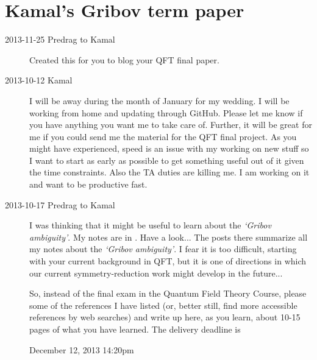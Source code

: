 
\chapter{Kamal's Gribov term paper}
\label{c-dailyBlogKS}

\begin{description}
\item[2013-11-25  Predrag to Kamal] Created this for you to blog
your QFT final paper.

\item[2013-10-12  Kamal] I will be away during the month of January for my wedding.
I will be working from home and updating through GitHub.
Please let me know if you have anything you want me to take care of.
Further, it will be great for me if you could send me the material
for the QFT final project. As you might have experienced, speed is
an issue with my working on new stuff so I want to start as early
as possible to get something useful out of it given the time constraints.
Also the TA duties are killing me. I am working on it and want to be productive fast.

\item[2013-10-17 Predrag to Kamal] I was thinking that it might be useful
to learn about the \emph{`Gribov ambiguity'}. My notes are in
. Have a look... The posts there summarize all my notes
about the \emph{`Gribov ambiguity'}. I fear it is too difficult, starting
with your current background in QFT, but it is one of directions in which
our current symmetry-reduction work might develop in the future...

So, instead of the final exam in the Quantum Field Theory Course, please
some of the references I have listed (or, better still, find more accessible
references by web searches) and write up here, as you learn, about 10-15
pages of what you have learned. The delivery deadline is

\begin{center}
{\large December 12, 2013 14:20pm}
\end{center}
\clearpage


\end{description}
